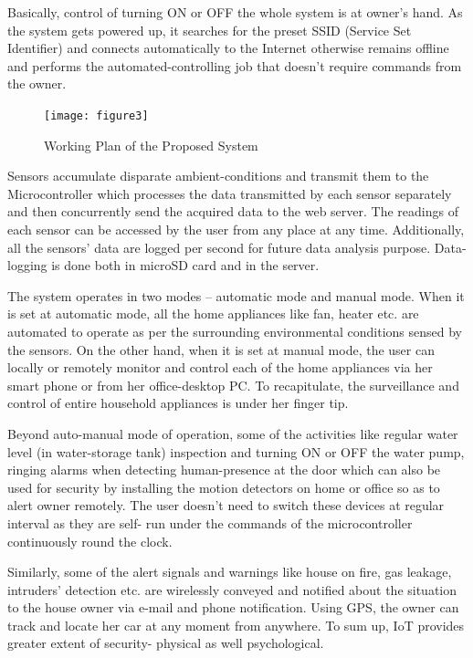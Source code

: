 \documentclass[journal,twoside]{IEEEtran}
\begin{document}
Basically, control of turning ON or OFF the whole system is
at owner’s hand. As the system gets powered up, it searches for
the preset SSID (Service Set Identifier) and connects
automatically to the Internet otherwise remains offline and
performs the automated-controlling job that doesn't require
commands from the owner.

\begin{figure}[!t]
\centering
\texttt{[image: figure3]}
\caption{Working Plan of the Proposed System}
\label{fig:working}
\end{figure}

Sensors accumulate disparate ambient-conditions and
transmit them to the Microcontroller which processes the data
transmitted by each sensor separately and then concurrently send
the acquired data to the web server. The readings of each sensor
can be accessed by the user from any place at any time.
Additionally, all the sensors’ data are logged per second for
future data analysis purpose. Data-logging is done both in
microSD card and in the server.

The system operates in two modes – automatic mode and
manual mode. When it is set at automatic mode, all the home
appliances like fan, heater etc. are automated to operate as per
the surrounding environmental conditions sensed by the sensors.
On the other hand, when it is set at manual mode, the user can
locally or remotely monitor and control each of the home
appliances via her smart phone or from her office-desktop PC.
To recapitulate, the surveillance and control of entire household
appliances is under her finger tip.

Beyond auto-manual mode of operation, some of the
activities like regular water level (in water-storage tank)
inspection and turning ON or OFF the water pump, ringing
alarms when detecting human-presence at the door which can
also be used for security by installing the motion detectors on
home or office so as to alert owner remotely. The user doesn’t
need to switch these devices at regular interval as they are self-
run under the commands of the microcontroller continuously
round the clock.

Similarly, some of the alert signals and warnings like house
on fire, gas leakage, intruders’ detection etc. are wirelessly
conveyed and notified about the situation to the house owner via
e-mail and phone notification. Using GPS, the owner can track
and locate her car at any moment from anywhere. To sum up,
IoT provides greater extent of security- physical as well
psychological.
\end{document}

